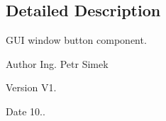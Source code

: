 \subsection{Detailed Description}
G\+UI window button component. 

\begin{DoxyAuthor}{Author}
Ing. Petr Simek 
\end{DoxyAuthor}
\begin{DoxyVersion}{Version}
V1. 
\end{DoxyVersion}
\begin{DoxyDate}{Date}
10.. 
\end{DoxyDate}

